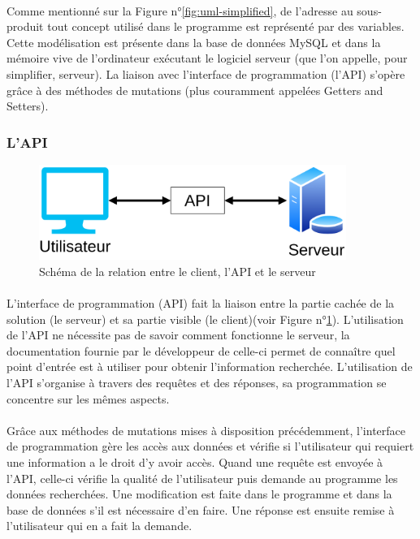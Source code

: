 \documentclass[a4paper, 12pt]{article}
\begin{document}
\paragraph{}Comme mentionné sur la Figure n°\ref{fig:uml-simplified}, de l’adresse au sous-produit tout concept utilisé dans le programme est représenté par des variables.  Cette modélisation est présente dans la base de données MySQL et dans la mémoire vive de l’ordinateur exécutant le logiciel serveur (que l’on appelle, pour simplifier, serveur). La liaison avec l’interface de programmation (l’API) s’opère grâce à des méthodes de mutations (plus couramment appelées Getters and Setters).

\subsubsection{L'API}

\begin{figure}[H]
	\begin{center}
		\includegraphics[width=10cm]{fig/API_diagram.png}
		\caption{Schéma de la relation entre le client, l'API et le serveur}
		\label{fig:API_diagram}
	\end{center}
\end{figure}

\paragraph{}L’interface de programmation (API) fait la liaison entre la partie cachée de la solution (le serveur) et sa partie visible (le client)(voir Figure n°\ref{fig:API_diagram}). L’utilisation de l’API ne nécessite pas de savoir comment fonctionne le serveur, la documentation fournie par le développeur de celle-ci permet de connaître quel point d’entrée est à utiliser pour obtenir l’information recherchée. L’utilisation de l’API s’organise à travers des requêtes et des réponses, sa programmation se concentre sur les mêmes aspects.
\paragraph{}Grâce aux méthodes de mutations mises à disposition précédemment, l’interface de programmation gère les accès aux données et vérifie si l’utilisateur qui requiert une information a le droit d’y avoir accès. Quand une requête est envoyée à l’API, celle-ci vérifie la qualité de l’utilisateur puis demande au programme les données recherchées. Une modification est faite dans le programme et dans la base de données s’il est nécessaire d’en faire. Une réponse est ensuite remise à l’utilisateur qui en a fait la demande.
\end{document}
